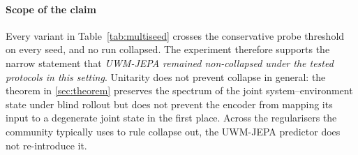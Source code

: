 \paragraph{Scope of the claim}
Every variant in Table~\ref{tab:multiseed} crosses the conservative
probe threshold on every seed, and no run collapsed. The experiment
therefore supports the narrow statement that \emph{UWM-JEPA remained
non-collapsed under the tested protocols in this setting}. Unitarity
does not prevent collapse in general: the theorem in
\cref{sec:theorem} preserves the spectrum of the joint
system--environment state under blind rollout but does not prevent
the encoder from mapping its input to a degenerate joint state in the
first place. Across the regularisers the community typically uses to
rule collapse out, the UWM-JEPA predictor does not re-introduce it.
